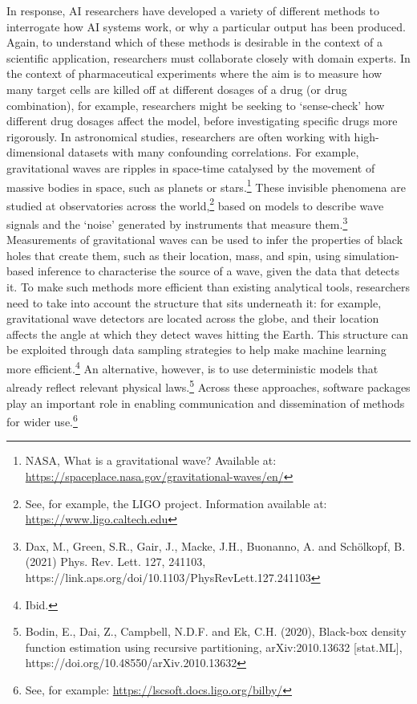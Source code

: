 In response, AI researchers have developed a variety of different
methods to interrogate how AI systems work, or why a particular output
has been produced. Again, to understand which of these methods is
desirable in the context of a scientific application, researchers must
collaborate closely with domain experts. In the context of
pharmaceutical experiments where the aim is to measure how many target
cells are killed off at different dosages of a drug (or drug
combination), for example, researchers might be seeking to `sense-check'
how different drug dosages affect the model, before investigating
specific drugs more rigorously. In astronomical studies, researchers are
often working with high-dimensional datasets with many confounding
correlations. For example, gravitational waves are ripples in space-time
catalysed by the movement of massive bodies in space, such as planets or
stars.\footnote{NASA, What is a gravitational wave? Available at:
  \url{https://spaceplace.nasa.gov/gravitational-waves/en/}}
These invisible phenomena are studied at observatories across the
world,\footnote{See, for example, the LIGO project. Information
  available at:
  \url{https://www.ligo.caltech.edu}}
based on models to describe wave signals and the `noise' generated by
instruments that measure them.\footnote{Dax, M., Green, S.R., Gair, J.,
  Macke, J.H., Buonanno, A. and Schölkopf, B. (2021) Phys. Rev. Lett.
  127, 241103, https://link.aps.org/doi/10.1103/PhysRevLett.127.241103}
Measurements of gravitational waves can be used to infer the properties
of black holes that create them, such as their location, mass, and spin,
using simulation-based inference to characterise the source of a wave,
given the data that detects it. To make such methods more efficient than
existing analytical tools, researchers need to take into account the
structure that sits underneath it: for example, gravitational wave
detectors are located across the globe, and their location affects the
angle at which they detect waves hitting the Earth. This structure can
be exploited through data sampling strategies to help make machine
learning more efficient.\footnote{Ibid.} An alternative, however, is to
use deterministic models that already reflect relevant physical
laws.\footnote{Bodin, E., Dai, Z., Campbell, N.D.F. and Ek, C.H. (2020),
  Black-box density function estimation using recursive partitioning,
  arXiv:2010.13632 {[}stat.ML{]},
  https://doi.org/10.48550/arXiv.2010.13632} Across these approaches,
software packages play an important role in enabling communication and
dissemination of methods for wider use.\footnote{See, for example:
  \url{https://lscsoft.docs.ligo.org/bilby/}}

